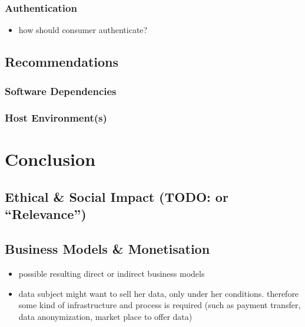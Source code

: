 \documentclass[12pt,english,a4paper,titlepage,cleardoublepage=empty,dottedtoc]{report}
\providecommand{\tightlist}{%
  \setlength{\itemsep}{0pt}\setlength{\parskip}{0pt}}
\begin{document}
\subsection{Authentication}\label{authentication-2}

\begin{itemize}
\tightlist
\item
  how should consumer authenticate?
\end{itemize}

\section{Recommendations}\label{recommendations}

\subsection{Software Dependencies}\label{software-dependencies}

\subsection{Host Environment(s)}\label{host-environments}

\chapter{Conclusion}\label{conclusion}

\section{\texorpdfstring{Ethical \& Social Impact (TODO: or
``Relevance'')}{Ethical \& Social Impact (TODO: or Relevance)}}\label{ethical-social-impact-todo-or-relevance}

\section{Business Models \&
Monetisation}\label{business-models-monetisation}

\begin{itemize}
\tightlist
\item
  possible resulting direct or indirect business models
\item
  data subject might want to sell her data, only under her conditions.
  therefore some kind of infrastructure and process is required (such as
  payment transfer, data anonymization, market place to offer data)
\end{itemize}
\end{document}
